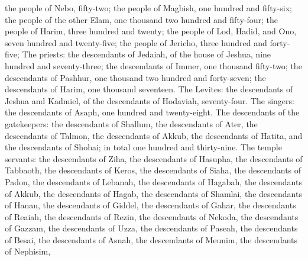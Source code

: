 \begin{biblechapter}
\verse the people of Nebo, fifty-two;
\verse the people of Magbish, one hundred and fifty-six;
\verse the people of the other Elam, one thousand two hundred and fifty-four;
\verse the people of Harim, three hundred and twenty;
\verse the people of Lod, Hadid, and Ono, seven hundred and twenty-five;
\verse the people of Jericho, three hundred and forty-five;
\verse The priests: the descendants of Jedaiah, of the house of Jeshua, nine hundred and seventy-three;
\verse the descendants of Immer, one thousand fifty-two;
\verse the descendants of Pashhur, one thousand two hundred and forty-seven;
\verse the descendants of Harim, one thousand seventeen.
\verse The Levites: the descendants of Jeshua and Kadmiel, of the descendants of Hodaviah, seventy-four.
\verse The singers: the descendants of Asaph, one hundred and twenty-eight.
\verse The descendants of the gatekeepers: the descendants of Shallum, the descendants of Ater, the descendants of Talmon, the descendants of Akkub, the descendants of Hatita, and the descendants of Shobai; in total one hundred and thirty-nine.
\verse The temple servants: the descendants of Ziha, the descendants of Hasupha, the descendants of Tabbaoth,
\verse the descendants of Keros, the descendants of Siaha, the descendants of Padon,
\verse the descendants of Lebanah, the descendants of Hagabah, the descendants of Akkub,
\verse the descendants of Hagab, the descendants of Shamlai, the descendants of Hanan,
\verse the descendants of Giddel, the descendants of Gahar, the descendants of Reaiah,
\verse the descendants of Rezin, the descendants of Nekoda, the descendants of Gazzam,
\verse the descendants of Uzza, the descendants of Paseah, the descendants of Besai,
\verse the descendants of Asnah, the descendants of Meunim, the descendants of Nephisim,

\end{biblechapter}
